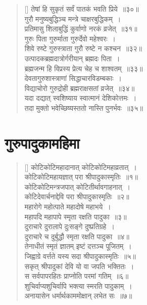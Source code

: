 \documentclass[twoside,12pt,notitlepage]{book}
\begin{document}
\begin{verse}[\versewidth]
तेषां हि सुकृतं सर्वं पातकं भवति प्रिये~॥३०॥\footA \\
गुरौ मनुष्यबुद्धिञ्च मन्त्रे चाक्षरबुद्धिकम्~।\\[-6pt]
प्रतिमासु शिलाबुद्धिं कुर्वाणो नरकं व्रजेत्~॥३१॥\\
गुरुः पिता गुरुर्माता गुरुर्देवो महेश्वरः~।\\[-6pt]
शिवे रुष्टे गुरुस्त्राता गुरौ रुष्टे न कश्चन~॥३२॥\\
उत्पादकब्रह्मदात्रोर्गरीयान् ब्रह्मदः पिता~।\\[-6pt]
ब्रह्मजन्म हि विप्रस्य प्रेत्य चेह च शाश्वतम्~॥३३॥\footA \\
देवतागुरुशास्त्राणां सिद्धाचारविडम्बकाः~।\\[-6pt]
विद्याचोरो गुरुद्रोही ब्रह्मराक्षसतां व्रजेत्~॥३४॥\\
यदा दद्यात् स्वशिष्याय स्वात्मानं देशिकोत्तमः~।\\[-6pt]
तदा मुक्तो भवेच्छिष्यस्ततो नास्ति पुनर्भवः~॥३५॥
\end{verse}

\section*{गुरुपादुकामहिमा}
\begin{verse}[\versewidth]
कोटिकोटिमहादानात् कोटिकोटिमहाव्रतात्~।\\[-6pt]
कोटिकोटिमहायज्ञात् परा श्रीपादुकास्मृतिः~॥१॥\\
कोटिकोटिमन्त्रजपात् कोटितीर्थावगाहनात्~।\\[-6pt]
कोटिदेवार्चनाद्देवि परा श्रीपादुकास्मृतिः~॥२॥\\
महारोगे महोत्पाते महादोषे महाभये~।\\[-6pt]
महापदि महापापे स्मृता रक्षति पादुका~॥३॥\\
दुराचारे दुरालापे दुःसङ्गे दुष्प्रतिग्रहे~।\\[-6pt]
दुराचारे च दुर्बुद्धौ स्मृता रक्षति पादुका~॥४॥\\
तेनाधीतं स्मृतं ज्ञातम् इष्टं दत्तञ्च पूजितम्~।\\[-6pt]
जिह्वाग्रे वर्त्तते यस्य सदा श्रीपादुकास्मृतिः~॥५॥\\
सकृत् श्रीपादुकां देवि यो वा जपति भक्तितः~।\\[-6pt]
स सर्वपापरहितः प्राप्नोति परमां गतिम्~॥६॥\\
शुचिर्वाप्यशुचिर्वापि भक्त्या स्मरति पादुकाम्~।\\[-6pt]
अनायासेन धर्मार्थकाममोक्षान् लभेत सः~॥७॥
\end{verse}
\end{document}
